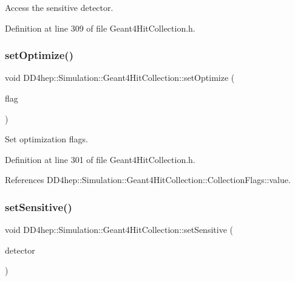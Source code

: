 Access the sensitive detector. 



Definition at line 309 of file Geant4\+Hit\+Collection.\+h.

\hypertarget{class_d_d4hep_1_1_simulation_1_1_geant4_hit_collection_a163e9842ded780e1f39dbe6701c132d8}{}\label{class_d_d4hep_1_1_simulation_1_1_geant4_hit_collection_a163e9842ded780e1f39dbe6701c132d8} 
\subsubsection{\texorpdfstring{set\+Optimize()}{setOptimize()}}
{\footnotesize\ttfamily void D\+D4hep\+::\+Simulation\+::\+Geant4\+Hit\+Collection\+::set\+Optimize (\begin{DoxyParamCaption}\item[{int}]{flag }\end{DoxyParamCaption})\hspace{0.3cm}{\ttfamily [inline]}}



Set optimization flags. 



Definition at line 301 of file Geant4\+Hit\+Collection.\+h.



References D\+D4hep\+::\+Simulation\+::\+Geant4\+Hit\+Collection\+::\+Collection\+Flags\+::value.

\hypertarget{class_d_d4hep_1_1_simulation_1_1_geant4_hit_collection_a5d4547aa0f97d5ef2391986f634806d5}{}\label{class_d_d4hep_1_1_simulation_1_1_geant4_hit_collection_a5d4547aa0f97d5ef2391986f634806d5} 
\subsubsection{\texorpdfstring{set\+Sensitive()}{setSensitive()}}
{\footnotesize\ttfamily void D\+D4hep\+::\+Simulation\+::\+Geant4\+Hit\+Collection\+::set\+Sensitive (\begin{DoxyParamCaption}\item[{\hyperlink{class_d_d4hep_1_1_simulation_1_1_geant4_sensitive}{Geant4\+Sensitive} $\ast$}]{detector }\end{DoxyParamCaption})\hspace{0.3cm}{\ttfamily [inline]}}



